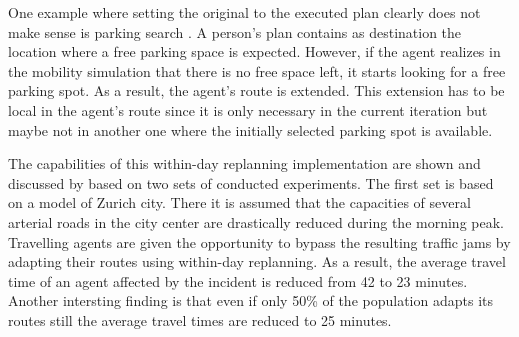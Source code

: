 One example where setting the original to the executed plan clearly does not make sense is parking search 
.
A person's plan contains as destination the location where a free parking space is expected. However, if the agent realizes in the mobility simulation that there is no free space left, it starts looking for a free parking spot. As a result, the agent's route is extended. This extension has to be local in the agent's route since it is only necessary in the current iteration
but maybe not in another one where the initially selected parking spot is available.



The capabilities of this within-day replanning implementation are shown and discussed by \citet{Dobler_PhDThesis_2013} based on two sets of conducted experiments. The first set is based on a model of Zurich city. There it is assumed that the capacities of several arterial roads in the city center are drastically reduced during the morning peak. Travelling agents are given the opportunity to bypass the resulting traffic jams by adapting their routes using within-day replanning. As a result, the average travel time of an agent affected by the incident is reduced from 42 to 23 minutes. Another intersting finding is that even if only 50\% of the population adapts its routes still the average travel times are reduced to 25 minutes.

